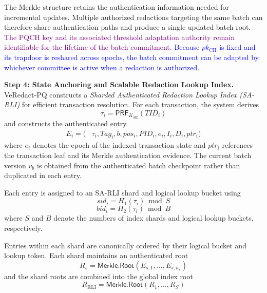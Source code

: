 \documentclass[lettersize,journal]{IEEEtran}
\begin{document}
The Merkle structure retains the authentication
information needed for incremental updates.
Multiple authorized redactions targeting the
same batch can therefore share authentication
paths and produce a single updated batch root.
\textcolor{purple}{The PQCH key and its associated threshold
adaptation authority remain identifiable for
the lifetime of the batch commitment.}
\textcolor{blue}{Because $pk_{\mathrm{CH}}$ is fixed and its trapdoor is
reshared across epochs, the batch commitment can be adapted by whichever
committee is active when a redaction is authorized.}

\medskip
\noindent\textbf{Step 4: State Anchoring and Scalable
Redaction Lookup Index.}
VeRedact-PQ constructs a \emph{Sharded
Authenticated Redaction Lookup Index (SA-RLI)}
for efficient transaction resolution. For each
transaction, the system derives
\begin{equation}
\tau_i=
\mathsf{PRF}_{K_{\mathrm{idx}}}(TID_i)
\end{equation}
and constructs the authenticated entry
\begin{equation}
\begin{aligned}
E_i=\big(&\tau_i,Tag_i,b,pos_i,PID_i,e_i,I_i,D_i,ptr_i\big)
\end{aligned}
\end{equation}
where $e_i$ denotes the epoch of the indexed
transaction state and $ptr_i$ references the
transaction leaf and its Merkle authentication
evidence. The current batch version $v_b$ is
obtained from the authenticated batch checkpoint
rather than duplicated in each entry.

Each entry is assigned to an SA-RLI shard
and logical lookup bucket using
\begin{equation}
sid_i=H_1(\tau_i)\bmod S
\end{equation}
\begin{equation}
bid_i=H_2(\tau_i)\bmod B
\end{equation}
where $S$ and $B$ denote the numbers of index
shards and logical lookup buckets, respectively.

Entries within each shard are canonically
ordered by their logical bucket and lookup
token. Each shard maintains an authenticated
root
\begin{equation}
R_s=
\mathsf{Merkle.Root}
(E_{s,1},\ldots,E_{s,n_s})
\end{equation}
and the shard roots are combined into the
global index root
\begin{equation}
R_{\mathrm{RLI}}=
\mathsf{Merkle.Root}(R_1,\ldots,R_S)
\end{equation}
\end{document}
